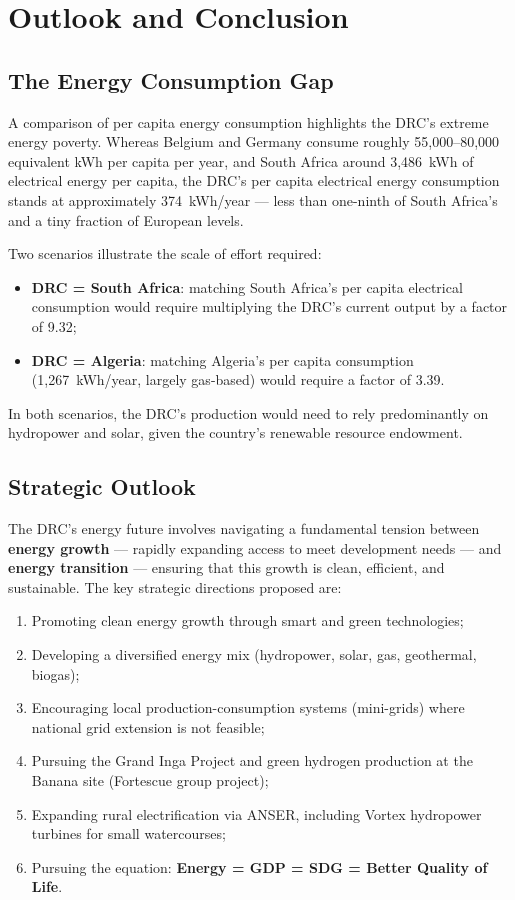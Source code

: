 \section{Outlook and Conclusion}

\subsection{The Energy Consumption Gap}

A comparison of per capita energy consumption highlights the DRC's extreme energy poverty. Whereas Belgium and Germany consume roughly 55{,}000--80{,}000 equivalent kWh per capita per year, and South Africa around 3{,}486~kWh of electrical energy per capita, the DRC's per capita electrical energy consumption stands at approximately 374~kWh/year — less than one-ninth of South Africa's and a tiny fraction of European levels.

Two scenarios illustrate the scale of effort required:
\begin{itemize}[noitemsep]
    \item \textbf{DRC = South Africa}: matching South Africa's per capita electrical consumption would require multiplying the DRC's current output by a factor of 9.32;
    \item \textbf{DRC = Algeria}: matching Algeria's per capita consumption (1{,}267~kWh/year, largely gas-based) would require a factor of 3.39.
\end{itemize}
In both scenarios, the DRC's production would need to rely predominantly on hydropower and solar, given the country's renewable resource endowment.

\subsection{Strategic Outlook}

The DRC's energy future involves navigating a fundamental tension between \textbf{energy growth} — rapidly expanding access to meet development needs — and \textbf{energy transition} — ensuring that this growth is clean, efficient, and sustainable. The key strategic directions proposed are:

\begin{enumerate}[noitemsep]
    \item Promoting clean energy growth through smart and green technologies;
    \item Developing a diversified energy mix (hydropower, solar, gas, geothermal, biogas);
    \item Encouraging local production-consumption systems (mini-grids) where national grid extension is not feasible;
    \item Pursuing the Grand Inga Project and green hydrogen production at the Banana site (Fortescue group project);
    \item Expanding rural electrification via ANSER, including Vortex hydropower turbines for small watercourses;
    \item Pursuing the equation: \textbf{Energy = GDP = SDG = Better Quality of Life}.
\end{enumerate}

